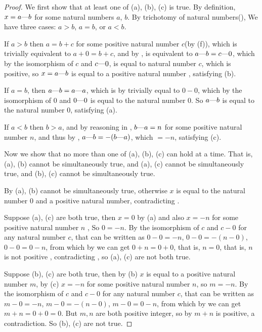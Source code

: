 \begin{proof}
We first show that at least one of (a), (b), (c) is true.
By definition, \(x = a \text{---} b\) for some natural numbers \(a\), \(b\).
By trichotomy of natural numbers(), We have three cases: \(a > b\), \(a = b\), or \(a < b\).

If \(a > b\) then \(a = b + c\) for some positive natural number \(c\)(by (f)),
which is trivially equivalent to \(a + 0 = b + c\),
and by , is equivalent to \(a \text{---} b = c \text{---} 0\),
which by the isomorphism of \(c\) and \(c \text{---} 0\), is equal to natural number \(c\), which is positive,
so \(x = a \text{---} b\) is equal to a positive natural number , satisfying (b).

If \(a = b\), then \(a \text{---} b = a \text{---} a\), which is by  trivially equal to \(0 - 0\),
which by the isomorphism of \(0\) and \(0 \text{---} 0\) is equal to the natural number \(0\).
So \(a \text{---} b\) is equal to the natural number \(0\), satisfying (a).

If \(a < b\) then \(b > a\), and by reasoning in , \(b \text{---} a = n\) for some positive natural number \(n\),
and thus by , \(a \text{---} b = -(b \text{---} a)\), which \(= -n\), satisfying (c).

Now we show that no more than one of (a), (b), (c) can hold at a
time.
That is, (a), (b) cannot be simultaneously true, and (a), (c) cannot be simultaneously true, and (b), (c) cannot be simultaneously true.

By  (a), (b) cannot be simultaneously true, otherwise \(x\) is equal to the natural number \(0\) and a positive natural number, contradicting .

Suppose (a), (c) are both true, then \(x = 0\) by (a) and also \(x = -n\) for some positive natural number \(n\) ,
So \(0 = -n\).
By the isomorphism of \(c\) and \(c - 0\) for any natural number \(c\), that can be written as \(0 - 0 = -n\), \(0 - 0 = -(n - 0)\), \(0 - 0 = 0 - n\),
from which by  we can get \(0 + n = 0 + 0\), that is, \(n = 0\), that is, \(n\) is not positive , contradicting ,
so (a), (c) are not both true.

Suppose (b), (c) are both true, then by (b) \(x\) is equal to a positive natural number \(m\), by (c) \(x = -n\) for some positive natural number \(n\), so \(m = -n\).
By the isomorphism of \(c\) and \(c - 0\) for any natural number \(c\), that can be written as \(m - 0 = -n\), \(m - 0 = -(n - 0)\), \(m - 0 = 0 - n\),
from which by  we can get \(m + n = 0 + 0 = 0\). But \(m, n\) are both positive integer, so by  \(m + n\) is positive, a contradiction.
So (b), (c) are not true.
\end{proof}

